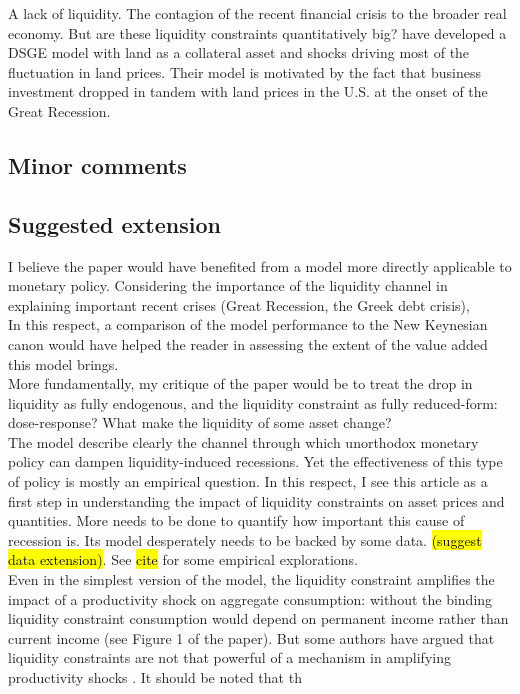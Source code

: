 \documentclass{amsart}
\theoremstyle{definition}
\theoremstyle{remark}
\numberwithin{equation}{section}
\begin{document}
A lack of liquidity. The contagion of the recent financial crisis to the broader real economy. But are these liquidity constraints quantitatively big? \cite{liu2013land} have developed a DSGE model with land as a collateral asset and shocks driving most of the fluctuation in land prices. Their model is motivated by the fact that business investment dropped in tandem with land prices in the U.S. at the onset of the Great Recession.

\subsection*{Minor comments}

\subsection*{Suggested extension}

I believe the paper would have benefited from a model more directly applicable to monetary policy. Considering the importance of the liquidity channel in explaining important recent crises (Great Recession, the Greek debt crisis), \\

In this respect, a comparison of the model performance to the New Keynesian canon \citep{gali2015monetary} would have helped the reader in assessing the extent of the value added this model brings.\\

More fundamentally, my critique of the paper would be to treat the drop in liquidity as fully endogenous, and the liquidity constraint as fully reduced-form: dose-response? What make the liquidity of some asset change?\\

The model describe clearly the channel through which unorthodox monetary policy can dampen liquidity-induced recessions. Yet the effectiveness of this type of policy is mostly an empirical question. In this respect, I see this article as a first step in understanding the impact of liquidity constraints on asset prices and quantities. More needs to be done to quantify how important this cause of recession is. Its model desperately needs to be backed by some data. \hl{(suggest data extension)}. See \hl{cite} for some empirical explorations.\\

Even in the simplest version of the model, the liquidity constraint amplifies the impact of a productivity shock on aggregate consumption: without the binding liquidity constraint consumption would depend on permanent income rather than current income (see Figure 1 of the paper). But some authors have argued that liquidity constraints are not that powerful of a mechanism in amplifying productivity shocks \citep{cordoba2004credit}. It should be noted that th \\
\end{document}
